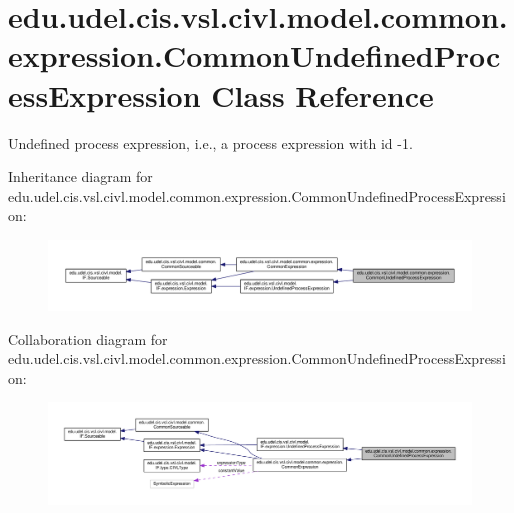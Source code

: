 \hypertarget{classedu_1_1udel_1_1cis_1_1vsl_1_1civl_1_1model_1_1common_1_1expression_1_1CommonUndefinedProcessExpression}{}\section{edu.\+udel.\+cis.\+vsl.\+civl.\+model.\+common.\+expression.\+Common\+Undefined\+Process\+Expression Class Reference}
\label{classedu_1_1udel_1_1cis_1_1vsl_1_1civl_1_1model_1_1common_1_1expression_1_1CommonUndefinedProcessExpression}


Undefined process expression, i.\+e., a process expression with id -\/1.  




Inheritance diagram for edu.\+udel.\+cis.\+vsl.\+civl.\+model.\+common.\+expression.\+Common\+Undefined\+Process\+Expression\+:
\nopagebreak
\begin{figure}[H]
\begin{center}
\leavevmode
\includegraphics[width=350pt]{classedu_1_1udel_1_1cis_1_1vsl_1_1civl_1_1model_1_1common_1_1expression_1_1CommonUndefinedProcessExpression__inherit__graph}
\end{center}
\end{figure}


Collaboration diagram for edu.\+udel.\+cis.\+vsl.\+civl.\+model.\+common.\+expression.\+Common\+Undefined\+Process\+Expression\+:
\nopagebreak
\begin{figure}[H]
\begin{center}
\leavevmode
\includegraphics[width=350pt]{classedu_1_1udel_1_1cis_1_1vsl_1_1civl_1_1model_1_1common_1_1expression_1_1CommonUndefinedProcessExpression__coll__graph}
\end{center}
\end{figure}
